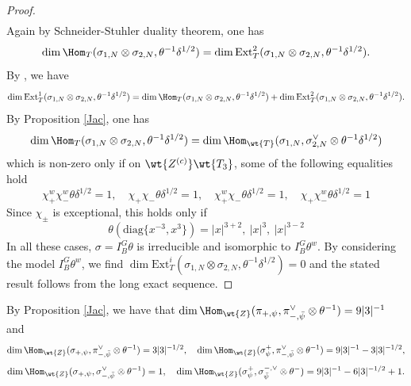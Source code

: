 \documentclass[11pt,reqno]{amsart}
\newcommand{\diag}{{\mathrm{diag}}}
\newcommand{\Ext}{{\mathrm{Ext}}}
\theoremstyle{plain}
\theoremstyle{remark} \newtheorem{remark}[thm]{Remark}
\theoremstyle{definition} \newtheorem{exercise}[thm]{Exercise}
\theoremstyle{definition} \newtheorem{example}[thm]{Example} \newtheorem{condition}[thm]{Condition}
\numberwithin{equation}{section}
\renewcommand{\-}{\text{--}}
\begin{document}
\begin{proof}
\begin{align*}
   \end{align*}
 Again by Schneider-Stuhler duality theorem, one has 
$$\dim\Hom_T(\sigma_{1,N}\otimes\sigma_{2,N}, \theta^{-1}\delta^{1/2})=\dim\Ext^2_T(\sigma_{1,N}\otimes\sigma_{2,N}, \theta^{-1}\delta^{1/2}).$$
 By \cite[Prop 2.9]{Pra18}, we have
 \begin{align*} 
    \dim\Ext^1_T(\sigma_{1,N}\otimes\sigma_{2,N}, \theta^{-1}\delta^{1/2})=\dim\Hom_T(\sigma_{1,N}\otimes\sigma_{2,N}, \theta^{-1}\delta^{1/2})+\dim\Ext^2_T(\sigma_{1,N}\otimes\sigma_{2,N}, \theta^{-1}\delta^{1/2}).
\end{align*}
By Proposition \ref{Jac}, one has 
$$\dim\Hom_T(\sigma_{1,N}\otimes\sigma_{2,N}, \theta^{-1}\delta^{1/2})
=\dim\Hom_{\wt{T}}(\sigma_{1,N},\sigma_{2,N}^\vee\otimes\theta^{-1}\delta^{1/2})$$
which is non-zero only if on $\wt{Z^{(c)}}\wt{T_3}$, some of the following equalities hold \[\chi_+^w\chi_{-}^w\theta\delta^{1/2}=1,\quad \chi_+\chi_{-}\theta\delta^{1/2}=1,\quad \chi_+^w\chi_{-}\theta\delta^{1/2}=1,\quad \chi_+\chi_{-}^w\theta\delta^{1/2}=1\]
Since $\chi_{\pm}$ is exceptional, this holds only if 
\[\theta(\diag\{x^{-3},x^{3}\})=|x|^{3+2},\ |x|^3,\ |x|^{3-2}\]
In all these cases, $\sigma=I_B^G\theta$ is irreducible and isomorphic to $I_B^G\theta^w$. By considering the model $I_B^G\theta^w$, we find 
$\dim\Ext^i_T(\sigma_{1,N}\otimes\sigma_{2,N},\theta^{-1}\delta^{1/2})=0$ and the stated result follows from the long exact sequence.
\end{proof}

By Proposition \ref{Jac}, we have that 
 $\dim\Hom_{\wt{Z}}(\pi_{+,\psi},\pi_{-,\bar{\psi}}^\vee\otimes\theta^{-1})=9|3|^{-1}$ and \[\dim\Hom_{\wt{Z}}(\sigma_{+,\psi},\pi_{-,\bar{\psi}}^\vee\otimes\theta^{-1})=3|3|^{-1/2},\quad \dim\Hom_{\wt{Z}}(\sigma^+_{\psi},\pi_{-,\bar{\psi}}^\vee\otimes\theta^{-1})=9|3|^{-1}-3|3|^{-1/2},\]
 \[\dim\Hom_{\wt{Z}}(\sigma_{+,\psi},\sigma_{-,\bar{\psi}}^\vee\otimes\theta^{-1})=1,\quad \dim\Hom_{\wt{Z}}(\sigma^+_{\psi},\sigma^{-,\vee}_{\bar{\psi}}\otimes\theta^{-})=9|3|^{-1}-6|3|^{-1/2}+1.\]
\end{document}
